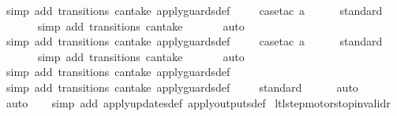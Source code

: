 \begin{isabellebody}
\ {\isacharparenleft}simp\ add{\isacharcolon}\ transitions\ can{\isacharunderscore}take\ apply{\isacharunderscore}guards{\isacharunderscore}def{\isacharparenright}\isanewline
\ \ \ \isamarkupfalse%
\ {\isacharparenleft}case{\isacharunderscore}tac\ {\isachardoublequoteopen}a{\isacharequal}{}{\isachardoublequoteclose}{\isacharparenright}\isanewline
\ \ \ \ \isamarkupfalse%
\ standard\isanewline
\ \ \ \ \ \isamarkupfalse%
\ {\isacharparenleft}simp\ add{\isacharcolon}\ transitions\ can{\isacharunderscore}take{\isacharparenright}\isanewline
\ \ \ \ \ \isamarkupfalse%
\ auto{\isacharbrackleft}{}{\isacharbrackright}\isanewline
\ \ \ \ \isamarkupfalse%
\ {\isacharparenleft}simp\ add{\isacharcolon}\ transitions\ can{\isacharunderscore}take\ apply{\isacharunderscore}guards{\isacharunderscore}def{\isacharparenright}\isanewline
\ \ \ \isamarkupfalse%
\ {\isacharparenleft}case{\isacharunderscore}tac\ {\isachardoublequoteopen}a{\isacharequal}{}{\isachardoublequoteclose}{\isacharparenright}\isanewline
\ \ \ \ \isamarkupfalse%
\ standard\isanewline
\ \ \ \ \ \isamarkupfalse%
\ {\isacharparenleft}simp\ add{\isacharcolon}\ transitions\ can{\isacharunderscore}take{\isacharparenright}\isanewline
\ \ \ \ \ \isamarkupfalse%
\ auto{\isacharbrackleft}{}{\isacharbrackright}\isanewline
\ \ \ \ \isamarkupfalse%
\ {\isacharparenleft}simp\ add{\isacharcolon}\ transitions\ can{\isacharunderscore}take\ apply{\isacharunderscore}guards{\isacharunderscore}def{\isacharparenright}\isanewline
\ \ \ \isamarkupfalse%
\ {\isacharparenleft}simp\ add{\isacharcolon}\ transitions\ can{\isacharunderscore}take\ apply{\isacharunderscore}guards{\isacharunderscore}def{\isacharparenright}\isanewline
\ \ \ \isamarkupfalse%
\ standard\isanewline
\ \ \ \ \isamarkupfalse%
\ auto{\isacharbrackleft}{}{\isacharbrackright}\isanewline
\ \ \ \isamarkupfalse%
\ auto{\isacharbrackleft}{}{\isacharbrackright}\isanewline
\ \ \isamarkupfalse%
\ {\isacharparenleft}simp\ add{\isacharcolon}\ apply{\isacharunderscore}updates{\isacharunderscore}def\ apply{\isacharunderscore}outputs{\isacharunderscore}def{\isacharparenright}%
\endisatagproof
{\isafoldproof}%
%
\isadelimproof
\isanewline
%
\endisadelimproof
\isanewline
{}\isamarkupfalse%
\ ltl{\isacharunderscore}step{\isacharunderscore}motorstop{\isacharunderscore}invalid{\isacharunderscore}r{}{\isacharcolon}\isanewline

\end{isabellebody}

